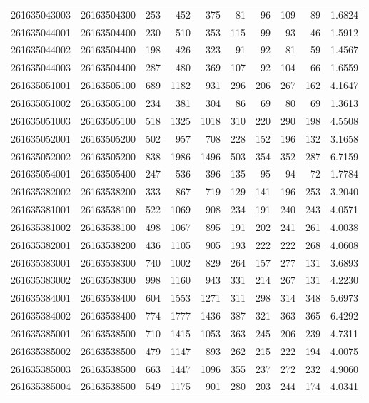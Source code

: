 \documentclass[
  11pt,
]{article}
\begin{document}
\begin{longtable}[t]{llrrrrrrrr}
261635043003 & 26163504300 & 253 & 452 & 375 & 81 & 96 & 109 & 89 & 1.6824\\
261635044001 & 26163504400 & 230 & 510 & 353 & 115 & 99 & 93 & 46 & 1.5912\\
261635044002 & 26163504400 & 198 & 426 & 323 & 91 & 92 & 81 & 59 & 1.4567\\
261635044003 & 26163504400 & 287 & 480 & 369 & 107 & 92 & 104 & 66 & 1.6559\\
261635051001 & 26163505100 & 689 & 1182 & 931 & 296 & 206 & 267 & 162 & 4.1647\\
261635051002 & 26163505100 & 234 & 381 & 304 & 86 & 69 & 80 & 69 & 1.3613\\
261635051003 & 26163505100 & 518 & 1325 & 1018 & 310 & 220 & 290 & 198 & 4.5508\\
261635052001 & 26163505200 & 502 & 957 & 708 & 228 & 152 & 196 & 132 & 3.1658\\
261635052002 & 26163505200 & 838 & 1986 & 1496 & 503 & 354 & 352 & 287 & 6.7159\\
261635054001 & 26163505400 & 247 & 536 & 396 & 135 & 95 & 94 & 72 & 1.7784\\
261635382002 & 26163538200 & 333 & 867 & 719 & 129 & 141 & 196 & 253 & 3.2040\\
261635381001 & 26163538100 & 522 & 1069 & 908 & 234 & 191 & 240 & 243 & 4.0571\\
261635381002 & 26163538100 & 498 & 1067 & 895 & 191 & 202 & 241 & 261 & 4.0038\\
261635382001 & 26163538200 & 436 & 1105 & 905 & 193 & 222 & 222 & 268 & 4.0608\\
261635383001 & 26163538300 & 740 & 1002 & 829 & 264 & 157 & 277 & 131 & 3.6893\\
261635383002 & 26163538300 & 998 & 1160 & 943 & 331 & 214 & 267 & 131 & 4.2230\\
261635384001 & 26163538400 & 604 & 1553 & 1271 & 311 & 298 & 314 & 348 & 5.6973\\
261635384002 & 26163538400 & 774 & 1777 & 1436 & 387 & 321 & 363 & 365 & 6.4292\\
261635385001 & 26163538500 & 710 & 1415 & 1053 & 363 & 245 & 206 & 239 & 4.7311\\
261635385002 & 26163538500 & 479 & 1147 & 893 & 262 & 215 & 222 & 194 & 4.0075\\
261635385003 & 26163538500 & 663 & 1447 & 1096 & 355 & 237 & 272 & 232 & 4.9060\\
261635385004 & 26163538500 & 549 & 1175 & 901 & 280 & 203 & 244 & 174 & 4.0341\\

\end{longtable}
\end{document}
